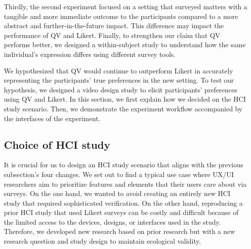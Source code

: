 Thirdly, the second experiment focused on a setting that surveyed matters with a tangible and more immediate outcome to the participants compared to a more abstract and further-in-the-future impact. This difference may impact the performance of QV and Likert. Finally, to strengthen our claim that QV performs better, we designed a within-subject study to understand how the same individual's expression differs using different survey tools.

We hypothesized that QV would continue to outperform Likert in accurately representing the participants' true preferences in the new setting. To test our hypothesis, we designed a video design study to elicit participants' preferences using QV and Likert. In this section, we first explain how we decided on the HCI study scenario. Then, we demonstrate the experiment workflow accompanied by the interfaces of the experiment.

 
\subsection{Choice of HCI study}
It is crucial for us to design an HCI study scenario that aligns with the previous subsection's four changes. We set out to find a typical use case where UX/UI researchers aim to prioritize features and elements that their users care about via surveys. On the one hand, we wanted to avoid creating an entirely new HCI study that required sophisticated verification. On the other hand, reproducing a prior HCI study that used Likert surveys can be costly and difficult because of the limited access to the devices, designs, or interfaces used in the study. Therefore, we developed new research based on prior research but with a new research question and study design to maintain ecological validity.

